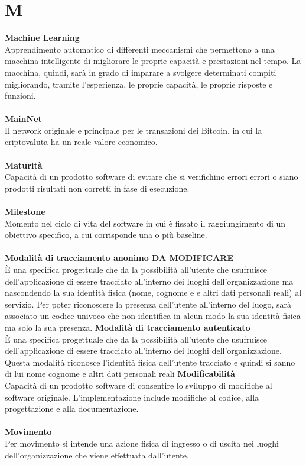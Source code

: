 \section{M}
\textbf{Machine Learning}\\
Apprendimento automatico di differenti meccanismi che permettono a una macchina intelligente di migliorare le proprie capacità e prestazioni nel tempo. La macchina, quindi, sarà in grado di imparare a svolgere determinati compiti migliorando, tramite l’esperienza, le proprie capacità, le proprie risposte e funzioni. \\ \\
\textbf{MainNet}\\
Il network originale e principale per le transazioni dei Bitcoin, in cui la criptovaluta ha un reale valore economico. \\ \\
\textbf{Maturità}\\
Capacità di un prodotto software di evitare che si verifichino errori errori o siano prodotti risultati non corretti in fase di esecuzione. \\ \\
\textbf{Milestone}\\
Momento nel ciclo di vita del software in cui è fissato il raggiungimento di un obiettivo specifico, a cui corrisponde una o più baseline.\\ \\
\textbf{Modalità di tracciamento anonimo DA MODIFICARE}\\
È una specifica progettuale che da la possibilità all’utente che usufruisce dell’applicazione di essere tracciato all'interno dei luoghi dell'organizzazione ma nascondendo la sua identità fisica (nome, cognome e e altri dati personali reali) al servizio. Per poter riconoscere la presenza dell'utente all'interno del luogo, sarà associato un codice univoco che non identifica in alcun modo la sua identità fisica ma solo la sua presenza.
\textbf{Modalità di tracciamento autenticato}\\
È una specifica progettuale che da la possibilità all’utente che usufruisce dell’applicazione di essere tracciato all'interno dei luoghi dell'organizzazione. Questa modalità riconosce l'identità fisica dell'utente tracciato e quindi si sanno di lui nome cognome e altri dati personali reali 
\textbf{Modificabilità}\\
Capacità di un prodotto software di consentire lo sviluppo di modifiche al software originale. L'implementazione include modifiche al codice, alla progettazione e alla documentazione.\\ \\
\textbf{Movimento}\\
Per movimento si intende una azione fisica di ingresso o di uscita nei luoghi dell'organizzazione che viene effettuata dall'utente. \\ \\
\clearpage
